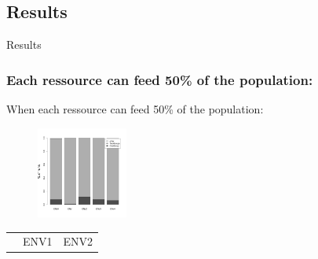 \documentclass[8pt, handout=show,notes=show]{beamer}
\begin{document}
\subsection{Results} \begin{frame}{Results} \subsubsection{Each ressource can feed 50\% of the population:} When each ressource can feed 50\% of the population: \renewcommand{\imgSize}{3cm} %
\begin{figure} 
	 \includegraphics[width=\imgSize]{images/qualitative_distribution} %
\end{figure} %
\begin{table}[H]
	 \centering 
	 \begin{tabular}{ccc} 
		&ENV1&ENV2\\ 

\end{tabular}
\end{table}
\end{frame}
\end{document}
